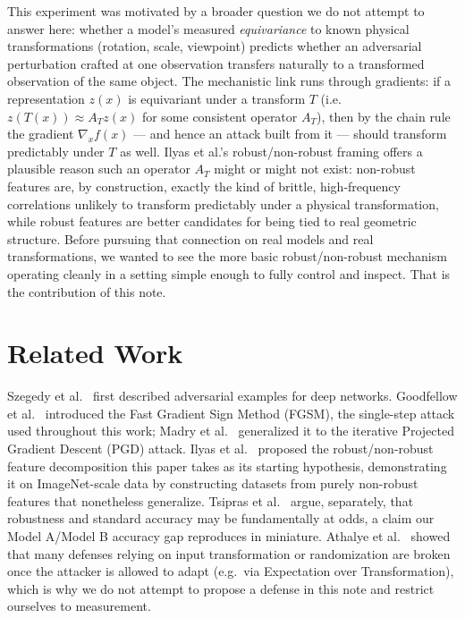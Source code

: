 \documentclass[11pt]{article}
\begin{document}
This experiment was motivated by a broader question we do not attempt to
answer here: whether a model's measured \emph{equivariance} to known
physical transformations (rotation, scale, viewpoint) predicts whether an
adversarial perturbation crafted at one observation transfers naturally to
a transformed observation of the same object. The mechanistic link runs
through gradients: if a representation $z(x)$ is equivariant under a
transform $T$ (i.e.\ $z(T(x)) \approx A_T z(x)$ for some consistent operator
$A_T$), then by the chain rule the gradient $\nabla_x f(x)$ --- and hence an
attack built from it --- should transform predictably under $T$ as well.
Ilyas et al.'s robust/non-robust framing offers a plausible reason such an
operator $A_T$ might or might not exist: non-robust features are, by
construction, exactly the kind of brittle, high-frequency correlations
unlikely to transform predictably under a physical transformation, while
robust features are better candidates for being tied to real geometric
structure. Before pursuing that connection on real models and real
transformations, we wanted to see the more basic robust/non-robust
mechanism operating cleanly in a setting simple enough to fully control and
inspect. That is the contribution of this note.

\section{Related Work}

Szegedy et al.\ \cite{szegedy2014} first described adversarial examples for
deep networks. Goodfellow et al.\ \cite{goodfellow2015} introduced the Fast
Gradient Sign Method (FGSM), the single-step attack used throughout this
work; Madry et al.\ \cite{madry2018} generalized it to the iterative
Projected Gradient Descent (PGD) attack. Ilyas et al.\ \cite{ilyas2019}
proposed the robust/non-robust feature decomposition this paper takes as
its starting hypothesis, demonstrating it on ImageNet-scale data by
constructing datasets from purely non-robust features that nonetheless
generalize. Tsipras et al.\ \cite{tsipras2018} argue, separately, that
robustness and standard accuracy may be fundamentally at odds, a claim our
Model A/Model B accuracy gap reproduces in miniature. Athalye et al.\
\cite{athalye2018} showed that many defenses relying on input
transformation or randomization are broken once the attacker is allowed to
adapt (e.g.\ via Expectation over Transformation), which is why we do not
attempt to propose a defense in this note and restrict ourselves to
measurement.
\end{document}
